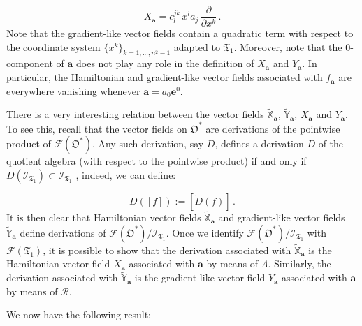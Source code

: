 \documentclass[11pt]{article}
\newcommand{\be}{\begin{equation}}
\newcommand{\ee}{\end{equation}}
\newcommand{\vsp}{\vspace{0.4cm}}
\newcommand{\obsp}{\mathfrak{O}}
\begin{document}
\be\label{eqn: hamiltonian vector field on trace 1}
X_{\mathbf{a}}=c^{jk}_{l}\,x^{l}a_{j}\,\frac{\partial}{\partial x^{k}}\,.
\ee
Note that the gradient-like vector fields contain a quadratic term with respect to the coordinate system $\{x^{k}\}_{k=1,...,n^{2}-1}$ adapted to $\mathfrak{T}_{1}$.
Moreover, note that the $0$-component of $\mathbf{a}$ does not play any role in the definition of $X_{\mathbf{a}}$ and $Y_{\mathbf{a}}$.
In particular, the Hamiltonian and gradient-like vector fields associated with $f_{\mathbf{a}}$ are  everywhere vanishing  whenever $\mathbf{a}=a_{0}\mathbf{e}^{0}$.


There is a very interesting relation between the vector fields $\widetilde{\mathbb{X}}_{\mathbf{a}}$, $\widetilde{\mathbb{Y}}_{\mathbf{a}}$, $X_{\mathbf{a}}$ and $Y_{\mathbf{a}}$.
To see this, recall that the vector fields on $\obsp^{*}$ are derivations of the pointwise product of $\mathcal{F}(\obsp^{*})$.
Any such derivation, say $\widetilde{D}$, defines a derivation $D$ of the quotient algebra (with respect to the  pointwise product) if and only if $D(\mathcal{I}_{\mathfrak{T}_{1}})\subset \mathcal{I}_{\mathfrak{T}_{1}}$ \cite{carinena_ibort_marmo_morandi-geometry_from_dynamics_classical_and_quantum}, indeed, we can define:

\be
D([f]):=[\widetilde{D}(f)]\,.
\ee
It is then clear that Hamiltonian vector fields $\widetilde{\mathbb{X}}_{\mathbf{a}}$ and gradient-like vector fields $\widetilde{\mathbb{Y}}_{\mathbf{a}}$ define derivations of $\mathcal{F}(\obsp^{*})/\mathcal{I}_{\mathfrak{T}_{1}}$.
Once we identify $\mathcal{F}(\obsp^{*})/\mathcal{I}_{\mathfrak{T}_{1}}$ with $\mathcal{F}(\mathfrak{T}_{1})$, it is possible to show that the derivation associated with $\widetilde{\mathbb{X}}_{\mathbf{a}}$ is the Hamiltonian vector field $X_{\mathbf{a}}$ associated with $\mathbf{a}$ by means of $\Lambda$.
Similarly, the derivation associated with $\widetilde{\mathbb{Y}}_{\mathbf{a}}$ is the gradient-like vector field $Y_{\mathbf{a}}$ associated with $\mathbf{a}$ by means of $\mathcal{R}$.

\vsp

We now have the following result:
\end{document}
